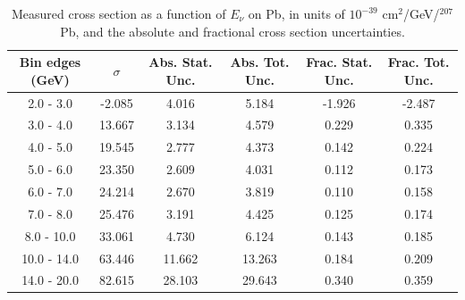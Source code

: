 \documentclass[aps,prl,twocolumn,superscriptaddress,nofootinbib]{revtex4-1}
\begin{document}
\begin{table}[h!]
  \centering
  \caption{Measured cross section as a function of $E_{\nu}$ on Pb, in units of
  $10^{-39}$ $\text{cm}^{2}$/GeV/$^{207}$Pb, and the absolute and
  fractional cross section uncertainties.}
    \begin{tabular}{c||c||c|c||c|c}
      Bin edges (GeV)  &  $\sigma$  &  Abs. Stat. Unc. & Abs. Tot. Unc.  &  Frac. Stat. Unc.  &  Frac. Tot. Unc. \\
      \hline\hline
        2.0 - 3.0 & -2.085 & 4.016 & 5.184 & -1.926 & -2.487 \\
        3.0 - 4.0 & 13.667 & 3.134 & 4.579 & 0.229 & 0.335 \\
        4.0 - 5.0 & 19.545 & 2.777 & 4.373 & 0.142 & 0.224 \\
        5.0 - 6.0 & 23.350 & 2.609 & 4.031 & 0.112 & 0.173 \\
        6.0 - 7.0 & 24.214 & 2.670 & 3.819 & 0.110 & 0.158 \\
        7.0 - 8.0 & 25.476 & 3.191 & 4.425 & 0.125 & 0.174 \\
       8.0 - 10.0 & 33.061 & 4.730 & 6.124 & 0.143 & 0.185 \\
      10.0 - 14.0 & 63.446 & 11.662 & 13.263 & 0.184 & 0.209 \\
      14.0 - 20.0 & 82.615 & 28.103 & 29.643 & 0.340 & 0.359 \\
    \end{tabular}
  \label{table:EnuXSec_Pb}
\end{table}
\end{document}
